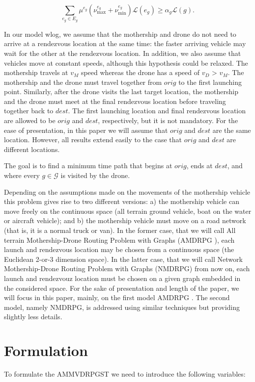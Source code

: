 \documentclass[10pt,a4paper]{article}
\def\AMD{{\sf AMDRPG \xspace }}
\def\NMD{{\sf NMDRPG\xspace}}
\newcommand{\JP}[1]{{\color{armygreen}#1}}
\newcommand{\LA}[1]{{\color{blue}#1}}
\begin{document}
\begin{equation}\label{eq:alpha-G}\tag{$\alpha$-G}
\sum_{e_g\in E_g} \mu^{e_g}(\nu_\text{max}^{e_g} + \nu_\text{min}^{e_g})\mathcal L(e_g)\geq \alpha_g\mathcal L(g).
\end{equation}

\JP{In our model wlog, we assume  that the mothership and drone do not need to arrive at a rendezvous location at the same time: the
faster arriving vehicle may wait for the other at the rendezvous location. In addition, we also assume that vehicles move at constant speeds, although this hypothesis could be relaxed. The mothership travels at $v_M$ speed whereas the drone has a speed of $v_D$ > $v_M$. The mothership and the drone must travel together from $orig$ to the first launching point. Similarly, after the drone visits the last target location, the mothership and the drone must meet at the final rendezvous location before traveling together back to $dest$. The first launching location and final rendezvous location are allowed to be $orig$ and $dest$, respectively, but it is not mandatory. For the ease of presentation, in this paper we will assume that $orig$ and $dest$ are the same location. However, all results extend easily to the case that $orig$ and $dest$ are different locations.

The goal is to find a minimum time path that begins at $orig$, ends at $dest$, and where
every $g \in \mathcal G$ is visited by the drone.

Depending on the assumptions made on the movements of the mothership vehicle this problem gives rise to two different versions: a) the mothership vehicle can move freely on the continuous space (all terrain ground vehicle, boat on the water or aircraft vehicle); and b) the mothership vehicle must move on a \LA{road} network (that is, it is a normal truck or van). In the former case, that we will call All terrain Mothership-Drone Routing Problem with Graphs (\AMD), each launch and rendezvous location may be chosen from a continuous space (the Euclidean 2-or-3 dimension space). In the latter case, that we will call Network Mothership-Drone Routing Problem with Graphs (\NMD) from now on, each launch and rendezvouz location must be chosen on a given graph embedded in the considered space. For the sake of presentation and length  of the paper, we will focus in this paper, mainly, on the first model \AMD. The second model, namely \NMD, is addressed using similar techniques but providing slightly less details.}

\section{Formulation}
To formulate the AMMVDRPGST we need to introduce the following variables:
\end{document}
